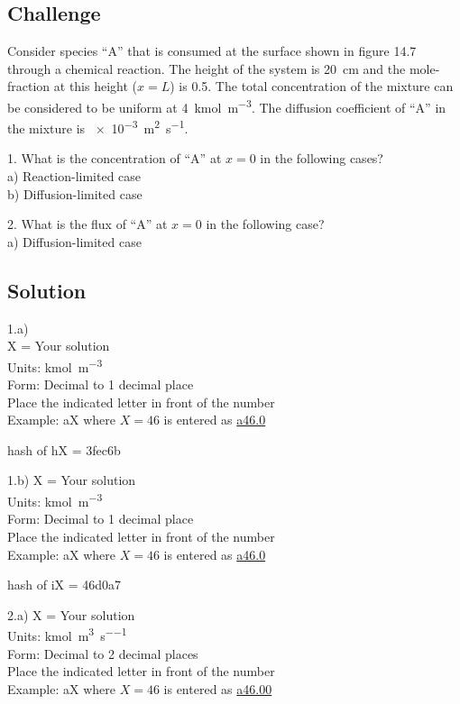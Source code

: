 \subsection*{Challenge}
Consider species ``A'' that is consumed at the surface shown in figure 14.7 through a chemical reaction. The height of the system is \SI{20}{\cm} and the mole-fraction at this height ($x=L$) is \num{0.5}. The total concentration of the mixture can be considered to be uniform at \SI{4}{\kmol\per\cubic\meter}. The diffusion coefficient of ``A'' in the mixture is \SI{e-3}{\square\meter\per\second}.

1. What is the concentration of ``A'' at $x=0$ in the following cases?\\
a) Reaction-limited case\\
b) Diffusion-limited case

2. What is the flux of ``A'' at $x=0$ in the following case?\\
a) Diffusion-limited case

\subsection*{Solution}
1.a)\\
X = Your solution\\
Units: \si{\kmol\per\cubic\meter}\\
Form: Decimal to 1 decimal place\\
Place the indicated letter in front of the number\\
Example: aX where $X=46$ is entered as \href{http://www.wolframalpha.com/input/?i=md5+hash+of+\%22a46.0\%22}{a46.0}

hash of hX = 3fec6b

1.b)
X = Your solution\\
Units: \si{\kmol\per\cubic\meter}\\
Form: Decimal to 1 decimal place\\
Place the indicated letter in front of the number\\
Example: aX where $X=46$ is entered as \href{http://www.wolframalpha.com/input/?i=md5+hash+of+\%22a46.0\%22}{a46.0}

hash of iX = 46d0a7

2.a)
X = Your solution\\
Units: \si{\kmol\per\cubic\meter\per\second}\\
Form: Decimal to 2 decimal places\\
Place the indicated letter in front of the number\\
Example: aX where $X=46$ is entered as \href{http://www.wolframalpha.com/input/?i=md5+hash+of+\%22a46.00\%22}{a46.00}

